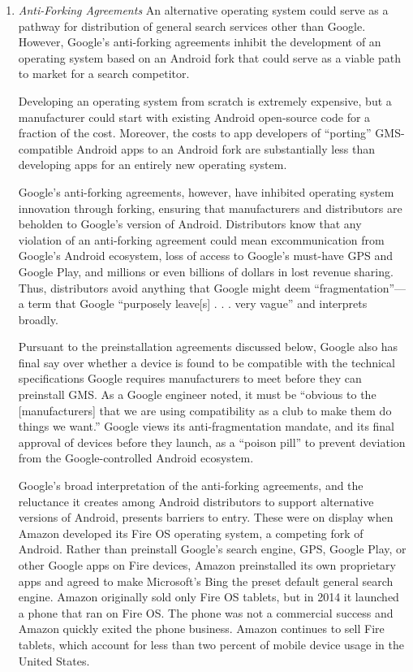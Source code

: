 \documentclass[11pt,b5paper,headings=small]{scrartcl}
\begin{document}
\begin{enumerate}


\item \textit{Anti-Forking Agreements}\quad
An alternative operating system could serve as a pathway for distribution of
general search services other than Google. However, Google’s anti-forking agreements inhibit
the development of an operating system based on an Android fork that could serve as a viable
path to market for a search competitor.


Developing an operating system from scratch is extremely expensive, but a
manufacturer could start with existing Android open-source code for a fraction of the cost.
Moreover, the costs to app developers of “porting” GMS-compatible Android apps to an Android
fork are substantially less than developing apps for an entirely new operating system.


Google’s anti-forking agreements, however, have inhibited operating system
innovation through forking, ensuring that manufacturers and distributors are beholden to
Google’s version of Android. Distributors know that any violation of an anti-forking agreement
could mean excommunication from Google’s Android ecosystem, loss of access to Google’s
must-have GPS and Google Play, and millions or even billions of dollars in lost revenue sharing.
Thus, distributors avoid anything that Google might deem “fragmentation”—a term that Google
“purposely leave[s] . . . very vague” and interprets broadly.


Pursuant to the preinstallation agreements discussed below, Google also has final
say over whether a device is found to be compatible with the technical specifications Google
requires manufacturers to meet before they can preinstall GMS. As a Google engineer noted, it
must be “obvious to the [manufacturers] that we are using compatibility as a club to make them
do things we want.” Google views its anti-fragmentation mandate, and its final approval of
devices before they launch, as a “poison pill” to prevent deviation from the Google-controlled
Android ecosystem.


Google’s broad interpretation of the anti-forking agreements, and the reluctance it
creates among Android distributors to support alternative versions of Android, presents barriers
to entry. These were on display when Amazon developed its Fire OS operating system, a
competing fork of Android. Rather than preinstall Google’s search engine, GPS, Google Play, or
other Google apps on Fire devices, Amazon preinstalled its own proprietary apps and agreed to
make Microsoft’s Bing the preset default general search engine. Amazon originally sold only
Fire OS tablets, but in 2014 it launched a phone that ran on Fire OS. The phone was not a
commercial success and Amazon quickly exited the phone business. Amazon continues to sell
Fire tablets, which account for less than two percent of mobile device usage in the United States.


\end{enumerate}
\end{document}
